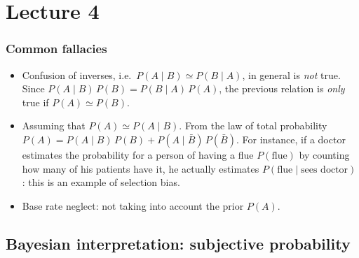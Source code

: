 \documentclass[
	10pt,
	draft
]{scrreprt}
\begin{document}


\chapter{Lecture 4}

			\subsection{Common fallacies}

\begin{itemize}
	\item
Confusion of inverses, i.e.~$P(A\mid B) \simeq P(B\mid A)$, in general is \emph{not} true.
Since $P(A\mid B)\,P(B) = P(B\mid A)\,P(A)$, the previous relation is \emph{only} true if $P(A)\simeq P(B)$.
	\item
Assuming that $P(A)\simeq P(A\mid B)$.
From the law of total probability $P(A) = P(A\mid B)\,P(B) + P(A\mid \bar B)\,P(\bar B)$.
For instance, if a doctor estimates the probability for a person of having a flue $P(\text{flue})$ by counting how many of his patients have it, he actually estimates $P(\text{flue}\mid\text{sees doctor})$: this is an example of selection bias.
	\item
Base rate neglect: not taking into account the prior $P(A)$.
\end{itemize}


		\section{Bayesian interpretation: subjective probability}
\end{document}
